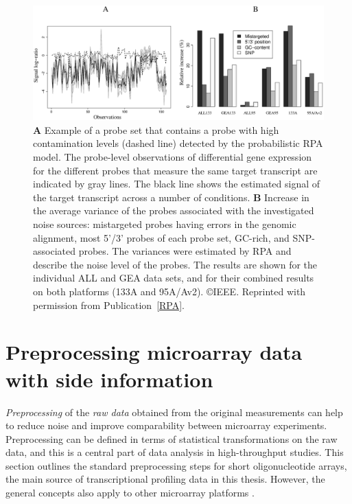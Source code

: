 \begin{figure}[t]
\label{fig:badprobe}
\begin{center}
\includegraphics[width=\textwidth]{pic/probecomparison.eps}
\end{center}
\caption{{\bf A} Example of a probe set that contains a probe with
  high contamination levels (dashed line) detected by the
  probabilistic RPA model. The probe-level observations of
  differential gene expression for the different probes that measure
  the same target transcript are indicated by gray lines. The black
  line shows the estimated signal of the target transcript across a
  number of conditions. {\bf B} Increase in the average variance of
  the probes associated with the investigated noise sources:
  mistargeted probes having errors in the genomic alignment, most
  5'/3' probes of each probe set, GC-rich, and SNP-associated probes.
  The variances were estimated by RPA and describe the noise level of
  the probes. The results are shown for the individual ALL and GEA
  data sets, and for their combined results on both platforms (133A
  and 95A/Av2). \copyright IEEE. Reprinted with permission from
  Publication~\ref{RPA}.} %
\end{figure}

\section{Preprocessing microarray data with side
  information}\label{sec:preprocessing}

{\it Preprocessing} of the {\it raw data} obtained from the original
measurements can help to reduce noise and improve comparability
between microarray experiments. Preprocessing can be defined in terms
of statistical transformations on the raw data, and this is a central
part of data analysis in high-throughput studies. This section
outlines the standard preprocessing steps for short oligonucleotide
arrays, the main source of transcriptional profiling data in this
thesis. However, the general concepts also apply to other microarray
platforms \citep{Reimers2010}.

